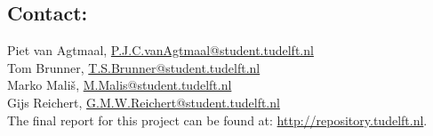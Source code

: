 \documentclass{article}
\begin{document}
\subsection*{Contact:}
\noindent Piet van Agtmaal, \href{mailto:P.J.C.vanAgtmaal@student.tudelft.nl}{P.J.C.vanAgtmaal@student.tudelft.nl}\\
Tom Brunner, \href{mailto:T.S.Brunner@student.tudelft.nl}{T.S.Brunner@student.tudelft.nl}\\
Marko Mali\v{s}, \href{mailto:M.Malis@student.tudelft.nl}{M.Malis@student.tudelft.nl}\\
Gijs Reichert, \href{mailto:G.M.W.Reichert@student.tudelft.nl}{G.M.W.Reichert@student.tudelft.nl}\\

\noindent The final report for this project can be found at: \url{http://repository.tudelft.nl}.
\end{document}
